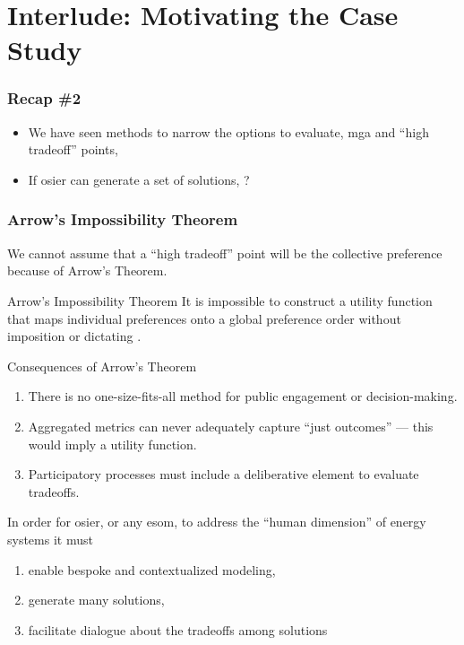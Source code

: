 \section{Interlude: Motivating the Case Study}

\begin{frame}
    \frametitle{Recap \#2}
    \begin{itemize}
        \item We have seen methods to narrow the options to evaluate, \gls{mga} and ``high tradeoff'' points, 
        \item If \gls{osier} can generate a set of solutions, ?
    \end{itemize}
\end{frame}

\begin{frame}
    \frametitle{Arrow's Impossibility Theorem}
    We cannot assume that a ``high tradeoff'' point will be the collective preference because of Arrow's Theorem.
    \pause
    \begin{block}{Arrow's Impossibility Theorem}
        It is impossible to construct a utility function
        that maps individual preferences onto a global preference
        order without imposition or dictating \cite{arrow_difficulty_1950,franssen_arrows_2005}.
    \end{block}
    \pause
    \begin{block}{Consequences of Arrow's Theorem}
        \begin{enumerate}[<+->]
            \item There is no one-size-fits-all method for public engagement or
            decision-making.
            \item Aggregated metrics can never adequately capture ``just outcomes'' ---
            this would imply a utility function.
            \item Participatory processes must include a deliberative element to evaluate
            tradeoffs.
        \end{enumerate}
    \end{block}
\end{frame}

\begin{frame}
    
    In order for \gls{osier}, or any \gls{esom}, to address the ``human dimension'' of energy systems it must
    \begin{enumerate}[<+->]
        \item enable bespoke and contextualized modeling,
        \item generate many solutions,
        \item facilitate dialogue about the tradeoffs among solutions
    \end{enumerate}

\end{frame}

